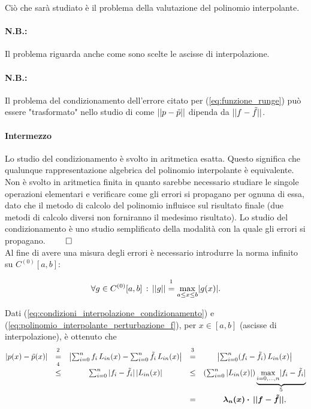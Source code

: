 Ciò che sarà studiato è il problema della valutazione del polinomio interpolante.

\paragraph{N.B.:} Il problema riguarda anche come sono scelte le ascisse di interpolazione.

\paragraph{N.B.:} Il problema del condizionamento dell'errore citato per (\ref{eq:funzione_runge}) può essere "trasformato" nello studio di come $||p-\Tilde{p}||$ dipenda da $||f-\Tilde{f}||$. 

\paragraph{Intermezzo}{Lo studio del condizionamento è svolto in aritmetica esatta. Questo significa che qualunque rappresentazione algebrica del polinomio interpolante è equivalente. Non è svolto in aritmetica finita in quanto sarebbe necessario studiare le singole operazioni elementari e verificare come gli errori si propagano per ognuna di essa, dato che il metodo di calcolo del polinomio influisce sul risultato finale (due metodi di calcolo diversi non forniranno il medesimo risultato). Lo studio del condizionamento è uno studio semplificato della modalità con la quale gli errori si propagano. $\qed$}\\

Al fine di avere una misura degli errori è necessario introdurre la norma infinito su $C^{(0)}[a,b]$:

\begin{equation}\label{eq:norma_infinito_g}
    \forall g\in C^{(0)}[a,b]\,:\, ||g||\overset{\footnotemark}{=}\underset{a\leq x\leq b}{\max}|g(x)|.
\end{equation}

Dati (\ref{eq:condizioni_interpolazione_condizionamento}) e (\ref{eq:polinomio_interpolante_perturbazione_f}), per $x\in [a,b]$ (ascisse di interpolazione), è ottenuto che
\begin{equation*}
    \begin{matrix}
        \left|p(x)-\Tilde{p}(x)\right|&\overset{\footnotemark}{=}&
        \left|\sum_{i=0}^nf_i\,L_{in}(x)-\sum_{i=0}^n\Tilde{f}_i\, L_{in}(x)\right|&\overset{\footnotemark}{=}&\left|\sum_{i=0}^n(f_i-\Tilde{f}_i)\,L_{in}(x)\right|\\
        &\overset{\footnotemark}{\leq}&
        \sum_{i=0}^n|f_i-\Tilde{f}_i|\,|L_{in}(x)|&\leq&\left(\sum_{i=0}^n|L_{in}(x)|\right)\underbrace{\underset{i=0,\hdots,n}{\max}|f_i-\Tilde{f}_i|}_{\footnotemark}\\
        && &=&\boldsymbol{\boldsymbol{\lambda_n(x)}\cdot\,||f-\Tilde{f}||},
    \end{matrix}
\end{equation*}

